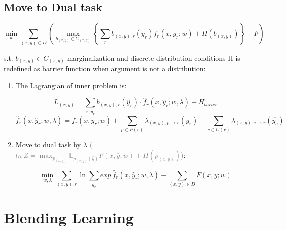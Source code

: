 \documentclass{beamer}
\begin{document}
\subsection*{Move to Dual task}
\begin{frame}
		\begin{tcolorbox}[colback=white!2, colframe=red!90]
			\vspace{-0.5cm}
			$$\min_w \sum_{(x, y) \in D} \left(\max_{b_{(x, y)} \in C_{(x, y)}} \left\{ \sum_r b_{(x, y), r} (y_r) f_r(x, y_r; w) + H(b_{(x, y)})\right\}- F \right) $$
			
			s.t. {\small $b_{(x, y)} \in C_{(x, y)}$} marginalization and discrete distribution conditions 
			{\scriptsize H is redefined as barrier function when argument is not a distribution:}
		\end{tcolorbox}
	
	\begin{enumerate}
	\item The Lagrangian of inner problem is:
	
	$$L_{(x, y)} = \sum_{r, \hat{y}_r} b_{(x, y), r} (\hat{y}_r) \cdot \hat{f}_r(x, \hat{y}_r; w, \lambda)  + H_{barier}$$
	$$\hat{f}_r(x, \hat{y}_r; w, \lambda)  = f_r(x, \hat{y}_r; w)  + \sum_{p \in P(r)} \lambda_{(x, y), p \rightarrow r} (\hat{y_r})- \sum_{c \in C(r)} \lambda_{(x, y), c \rightarrow r} (\hat{y_c})$$
	
	\item Move to dual task by $\lambda$ \small{\textcolor{gray}{($ln~Z = \max_{p_{(x, y)}} \mathbb{E}_{p_{(x, y)}(\hat{y})} F(x, \hat{y}; w) + H(p_{(x, y)})$)}}:
	
	$$\min_{w, \lambda} \sum_{(x, y), r} \ln{\sum_{\hat{y}_r}} exp~\hat{f}_r(x, \hat{y}_r; w, \lambda) - \sum_{(x, y) \in D} F(x, y; w)$$
	\end{enumerate}
	
	
\end{frame}

\section{Blending Learning}
\end{document}
